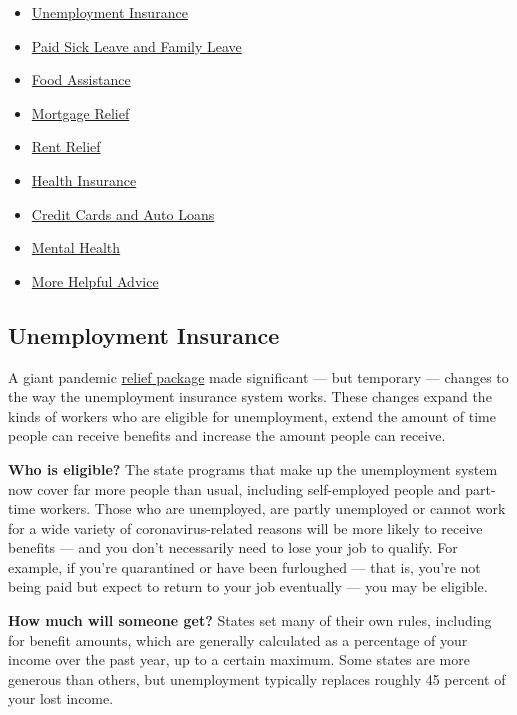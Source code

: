 \begin{itemize}
\tightlist
\item
  \protect\hyperlink{link-2f8736c0}{Unemployment Insurance}
\item
  \protect\hyperlink{link-4ccc30a7}{Paid Sick Leave and Family Leave}
\item
  \protect\hyperlink{link-3c2140bc}{Food Assistance}
\item
  \protect\hyperlink{link-39bfe27a}{Mortgage Relief}
\item
  \protect\hyperlink{link-1da1a7c4}{Rent Relief}
\item
  \protect\hyperlink{link-74e96196}{Health Insurance}
\item
  \protect\hyperlink{link-75bcf9dc}{Credit Cards and Auto Loans}
\item
  \protect\hyperlink{link-49737032}{Mental Health}
\item
  \protect\hyperlink{link-16f012f2}{More Helpful Advice}
\end{itemize}

\hypertarget{unemployment-insurance}{%
\subsection{Unemployment Insurance}\label{unemployment-insurance}}

A giant pandemic
\href{https://www.nytimes.com/2020/03/27/world/coronavirus-live-news-updates.html\#link-1900f91a}{relief
package} made significant --- but temporary --- changes to the way the
unemployment insurance system works. These changes expand the kinds of
workers who are eligible for unemployment, extend the amount of time
people can receive benefits and increase the amount people can receive.

\textbf{Who is eligible?} The state programs that make up the
unemployment system now cover far more people than usual, including
self-employed people and part-time workers. Those who are unemployed,
are partly unemployed or cannot work for a wide variety of
coronavirus-related reasons will be more likely to receive benefits ---
and you don't necessarily need to lose your job to qualify. For example,
if you're quarantined or have been furloughed --- that is, you're not
being paid but expect to return to your job eventually --- you may be
eligible.

\textbf{How much will someone get?} States set many of their own rules,
including for benefit amounts, which are generally calculated as a
percentage of your income over the past year, up to a certain maximum.
Some states are more generous than others, but unemployment typically
replaces roughly 45 percent of your lost income.

